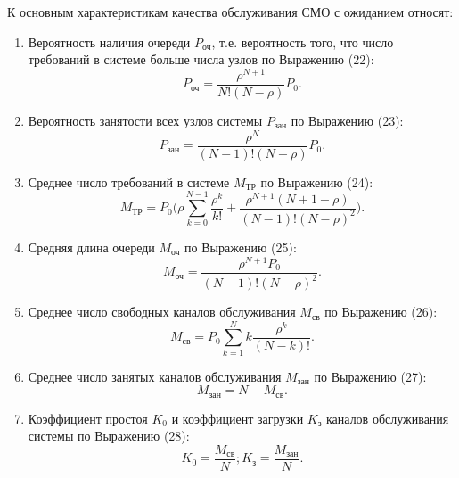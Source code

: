 \documentclass[14pt]{extarticle}
\begin{document}
    К основным характеристикам качества обслуживания СМО с ожиданием относят:
    \begin{enumerate}
        \item Вероятность наличия очереди $P_\text{оч}$, т.е. вероятность того, что число требований в системе больше числа узлов по Выражению (22):
        \begin{equation}
            P_\text{оч} = \frac{\rho^{N + 1}}{N!(N - \rho)} P_0.
        \end{equation}

        \item Вероятность занятости всех узлов системы $P_\text{зан}$ по Выражению (23):
        \begin{equation}
            P_\text{зан} = \frac{\rho^N}{(N - 1)!(N - \rho)} P_0.
        \end{equation}

        \item Среднее число требований в системе $M_\text{ТР}$ по Выражению (24):
        \begin{equation}
            M_\text{ТР} = P_0 \Bigg( \rho \sum_{k = 0}^{N - 1} \frac{\rho^k}{k!} + \frac{\rho^{N + 1} (N + 1 - \rho)}{(N - 1)!(N - \rho)^2} \Bigg).
        \end{equation}

        \item Средняя длина очереди $M_\text{оч}$ по Выражению (25):
        \begin{equation}
            M_\text{оч} = \frac{\rho^{N + 1} P_0}{(N - 1)!(N - \rho)^2}.\end{equation}

        \item Среднее число свободных каналов обслуживания $M_\text{св}$ по Выражению (26):
        \begin{equation}
            M_\text{св} = P_0 \sum_{k = 1}^N k \frac{\rho^k}{(N - k)!}.
        \end{equation}

        \item Среднее число занятых каналов обслуживания $M_\text{зан}$ по Выражению (27):
        \begin{equation}
            M_\text{зан} = N - M_\text{св}.
        \end{equation}

        \item Коэффициент простоя $K_0$ и коэффициент загрузки $K_\text{з}$ каналов обслуживания системы по Выражению (28):
        \begin{equation}
            K_0 = \frac{M_\text{св}}{N}; K_\text{з} = \frac{M_\text{зан}}{N}.
        \end{equation}


\end{enumerate}
\end{document}
